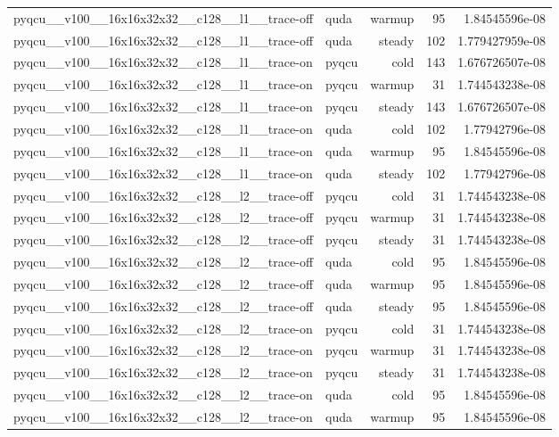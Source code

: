 \begin{table}[htbp]
\begin{tabular}{@{}llrrr@{}}
pyqcu\_\_v100\_\_16x16x32x32\_\_c128\_\_l1\_\_trace-off & quda & warmup & 95 & 1.84545596e-08 \\
pyqcu\_\_v100\_\_16x16x32x32\_\_c128\_\_l1\_\_trace-off & quda & steady & 102 & 1.779427959e-08 \\
pyqcu\_\_v100\_\_16x16x32x32\_\_c128\_\_l1\_\_trace-on & pyqcu & cold & 143 & 1.676726507e-08 \\
pyqcu\_\_v100\_\_16x16x32x32\_\_c128\_\_l1\_\_trace-on & pyqcu & warmup & 31 & 1.744543238e-08 \\
pyqcu\_\_v100\_\_16x16x32x32\_\_c128\_\_l1\_\_trace-on & pyqcu & steady & 143 & 1.676726507e-08 \\
pyqcu\_\_v100\_\_16x16x32x32\_\_c128\_\_l1\_\_trace-on & quda & cold & 102 & 1.77942796e-08 \\
pyqcu\_\_v100\_\_16x16x32x32\_\_c128\_\_l1\_\_trace-on & quda & warmup & 95 & 1.84545596e-08 \\
pyqcu\_\_v100\_\_16x16x32x32\_\_c128\_\_l1\_\_trace-on & quda & steady & 102 & 1.77942796e-08 \\
pyqcu\_\_v100\_\_16x16x32x32\_\_c128\_\_l2\_\_trace-off & pyqcu & cold & 31 & 1.744543238e-08 \\
pyqcu\_\_v100\_\_16x16x32x32\_\_c128\_\_l2\_\_trace-off & pyqcu & warmup & 31 & 1.744543238e-08 \\
pyqcu\_\_v100\_\_16x16x32x32\_\_c128\_\_l2\_\_trace-off & pyqcu & steady & 31 & 1.744543238e-08 \\
pyqcu\_\_v100\_\_16x16x32x32\_\_c128\_\_l2\_\_trace-off & quda & cold & 95 & 1.84545596e-08 \\
pyqcu\_\_v100\_\_16x16x32x32\_\_c128\_\_l2\_\_trace-off & quda & warmup & 95 & 1.84545596e-08 \\
pyqcu\_\_v100\_\_16x16x32x32\_\_c128\_\_l2\_\_trace-off & quda & steady & 95 & 1.84545596e-08 \\
pyqcu\_\_v100\_\_16x16x32x32\_\_c128\_\_l2\_\_trace-on & pyqcu & cold & 31 & 1.744543238e-08 \\
pyqcu\_\_v100\_\_16x16x32x32\_\_c128\_\_l2\_\_trace-on & pyqcu & warmup & 31 & 1.744543238e-08 \\
pyqcu\_\_v100\_\_16x16x32x32\_\_c128\_\_l2\_\_trace-on & pyqcu & steady & 31 & 1.744543238e-08 \\
pyqcu\_\_v100\_\_16x16x32x32\_\_c128\_\_l2\_\_trace-on & quda & cold & 95 & 1.84545596e-08 \\
pyqcu\_\_v100\_\_16x16x32x32\_\_c128\_\_l2\_\_trace-on & quda & warmup & 95 & 1.84545596e-08 \\

\end{tabular}
\end{table}
